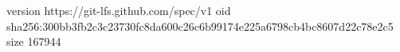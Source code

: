 version https://git-lfs.github.com/spec/v1
oid sha256:300bb3fb2c3c23730fc8da600c26c6b99174e225a6798cb4bc8607d22c78e2c5
size 167944
